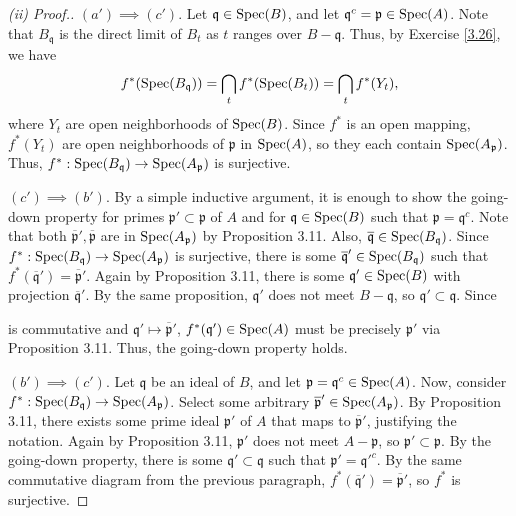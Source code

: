 \begin{proof}[(ii) Proof.]
$(a') \implies (c')$. Let $\mathfrak{q} \in \operatorname{Spec}(B)$, and let $\mathfrak{q}^c = \mathfrak{p} \in \operatorname{Spec}(A)$. Note that $B_{\mathfrak{q}}$ is the
direct limit of $B_t$ as $t$ ranges over $B - \mathfrak{q}$. Thus, by Exercise \ref{3.26}, we have
$$f^*(\operatorname{Spec}(B_{\mathfrak{q}})) = \bigcap_t f^*(\operatorname{Spec}(B_t)) = \bigcap_t f^*(Y_t),$$
where $Y_t$ are open neighborhoods of $\operatorname{Spec}(B)$. Since $f^*$ is an open mapping, $f^*(Y_t)$ are open neighborhoods of $\mathfrak{p}$ in $\operatorname{Spec}(A)$,
so they each contain $\operatorname{Spec}(A_{\mathfrak{p}})$. Thus, $f^* : \operatorname{Spec}(B_{\mathfrak{q}}) \to \operatorname{Spec}(A_{\mathfrak{p}})$ is surjective.

$(c') \implies (b')$. By a simple inductive argument, it is enough to show the going-down property for primes $\mathfrak{p}' \subset \mathfrak{p}$ 
of $A$ and for $\mathfrak{q} \in \operatorname{Spec}(B)$ such that $\mathfrak{p} = \mathfrak{q}^c$. Note that both $\overline{\mathfrak{p}}',\overline{\mathfrak{p}}$ are in 
$\operatorname{Spec}(A_{\mathfrak{p}})$ by Proposition 3.11. Also, $\overline{\mathfrak{q}} \in \operatorname{Spec}(B_{\mathfrak{q}})$. Since $f^* : \operatorname{Spec}(B_{\mathfrak{q}}) \to \operatorname{Spec}(A_{\mathfrak{p}})$
is surjective, there is some $\overline{\mathfrak{q}}' \in \operatorname{Spec}(B_{\mathfrak{q}})$ such that $f^*(\overline{\mathfrak{q}}') = \overline{\mathfrak{p}}'$. Again
by Proposition 3.11, there is some $\mathfrak{q}' \in \operatorname{Spec}(B)$ with projection $\overline{\mathfrak{q}}'$. By the same proposition, $\mathfrak{q}'$ does not meet $B - \mathfrak{q}$,
so $\mathfrak{q}' \subset \mathfrak{q}$. Since
\begin{center}
\end{center}
is commutative and $\mathfrak{q}' \mapsto \overline{\mathfrak{p}}'$, $f^*(\mathfrak{q}') \in \operatorname{Spec}(A)$ must be precisely $\mathfrak{p}'$ via Proposition 3.11. Thus, the going-down
property holds.

$(b') \implies (c')$. Let $\mathfrak{q}$ be an ideal of $B$, and let $\mathfrak{p} = \mathfrak{q}^c \in \operatorname{Spec}(A)$. Now, consider $f^* : \operatorname{Spec}(B_{\mathfrak{q}})
\to \operatorname{Spec}(A_{\mathfrak{p}})$. Select some arbitrary $\overline{\mathfrak{p}}' \in \operatorname{Spec}(A_{\mathfrak{p}})$. By Proposition 3.11, there exists some prime ideal $\mathfrak{p}'$
of $A$ that maps to $\overline{\mathfrak{p}}'$, justifying the notation. Again by Proposition 3.11, $\mathfrak{p}'$ does not meet $A - \mathfrak{p}$, so 
$\mathfrak{p}' \subset \mathfrak{p}$. By the going-down property, there is some $\mathfrak{q}' \subset \mathfrak{q}$ such that $\mathfrak{p}' = \mathfrak{q}'^c$. By the
same commutative diagram from the previous paragraph, $f^*(\overline{\mathfrak{q}}') = \overline{\mathfrak{p}}'$, so $f^*$ is surjective.
\end{proof}

